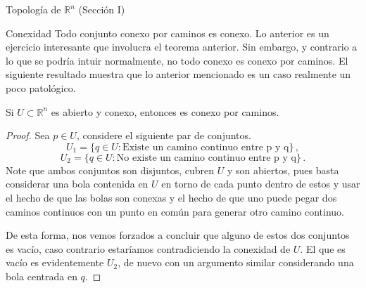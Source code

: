 \begin{chapter}{Topología de $\mathbb{R}^n$ (Sección I)}
\begin{section}{Conexidad}
Todo conjunto conexo por caminos es conexo. Lo anterior es un ejercicio interesante que involucra el teorema anterior. Sin embargo, y contrario a lo que se podría intuir normalmente, no todo conexo es conexo por caminos. El siguiente resultado muestra que lo anterior mencionado es un caso realmente un poco patológico.  

\begin{them}

Si $U \subset \mathbb{R}^n$ es abierto y conexo, entonces es conexo por caminos.

\end{them}

\begin{proof}

Sea $p \in U$, considere el siguiente par de conjuntos. 
$$U_1 = \{ q \in U: \text{Existe un camino continuo entre p y q} \}\,,$$
$$U_2 =  \{ q \in U: \text{No existe un camino continuo entre p y q} \}\,.$$
Note que ambos conjuntos son disjuntos, cubren $U$ y son abiertos, pues basta considerar una bola contenida en $U$ en torno de cada punto dentro de estos y usar el hecho de que las bolas son conexas y el hecho de que uno puede pegar dos caminos continuos con un punto en común para generar otro camino continuo.

De esta forma, nos vemos forzados a concluir que alguno de estos dos conjuntos es vacío, caso contrario estaríamos contradiciendo la conexidad de $U$. El que es vacío es evidentemente $U_2$, de nuevo con un argumento similar considerando una bola centrada en $q$.

\end{proof}

\end{section}
\end{chapter}
